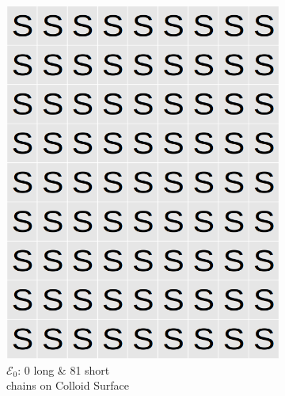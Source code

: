 \documentclass[journal=mamobx,manuscript=article]{achemso}
\begin{document}
\begin{figure}[H]
    \begin{subfigure}[b]{0.4\textwidth}
        \includegraphics[scale=0.15]{Sup_Fig1a.png}
        \caption{ $\mathcal{E}_0$:  0 long \& 81 short \\chains on Colloid Surface}
        \label{fig:A}
    \end{subfigure}
    \begin{subfigure}[b]{0.4\textwidth}

\end{subfigure}
\end{figure}
\end{document}
